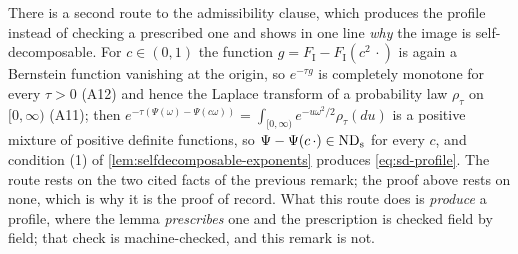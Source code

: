 \begin{remark}\label{rem:bridge-route}
There is a second route to the admissibility clause, which produces the profile instead of
checking a prescribed one and shows in one line \emph{why} the image is self-decomposable. For
$c \in (0,1)$ the function $g = F_{\mathrm I} - F_{\mathrm I}(c^2\,\cdot)$ is again a Bernstein
function vanishing at the origin, so $e^{-\tau g}$ is completely monotone for every $\tau > 0$
(A12) and hence the Laplace transform of a probability law $\rho_\tau$ on $[0,\infty)$ (A11);
then
$e^{-\tau(\Psi(\omega) - \Psi(c\omega))} = \int_{[0,\infty)} e^{-u\omega^2/2}\rho_\tau(du)$
is a positive mixture of positive definite functions, so
$\Psi - \Psi(c\,\cdot) \in \mathrm{ND}_{\mathrm{s}}$ for every $c$, and condition (1) of
\ref{lem:selfdecomposable-exponents} produces \ref{eq:sd-profile}. The route rests on the two
cited facts of the previous remark; the proof above rests on none, which is why it is the proof
of record. What this route does is \emph{produce} a profile, where the lemma \emph{prescribes}
one and the prescription is checked field by field; that check is machine-checked, and this
remark is not.
\end{remark}

